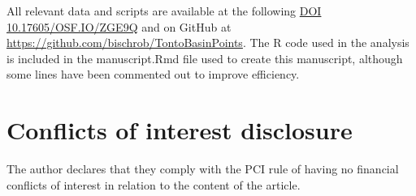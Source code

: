 \documentclass[PCJ,Unicode,screen,mode=plain]{cedram}
\begin{document}
All relevant data and scripts are available at the following \href{https://osf.io/zge9q/}{DOI 10.17605/OSF.IO/ZGE9Q} and on GitHub at \url{https://github.com/bischrob/TontoBasinPoints}. The R code used in the analysis is included in the manuscript.Rmd file used to create this manuscript, although some lines have been commented out to improve efficiency.

\section*{Conflicts of interest disclosure}

The author declares that they comply with the PCI rule of having no financial conflicts of interest in relation to the content of the article.

\nocite{Oliver1997-lk}

\printbibliography[notcategory=ignore]              %
\end{document}
